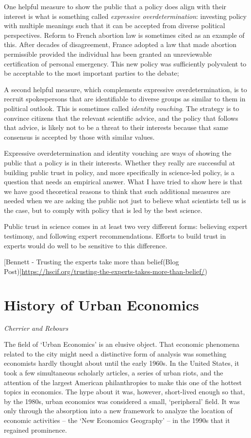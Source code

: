 \documentclass[
]{book}
\begin{document}
One helpful measure to show the public that a policy does align with their interest is what is something called \emph{expressive overdetermination}: investing policy with multiple meanings such that it can be accepted from diverse political perspectives. Reform to French abortion law is sometimes cited as an example of this. After decades of disagreement, France adopted a law that made abortion permissible provided the individual has been granted an unreviewable certification of personal emergency. This new policy was sufficiently polyvalent to be acceptable to the most important parties to the debate;

A second helpful measure, which complements expressive overdetermination, is to recruit spokespersons that are identifiable to diverse groups as similar to them in political outlook. This is sometimes called \emph{identity vouching}. The strategy is to convince citizens that the relevant scientific advice, and the policy that follows that advice, is likely not to be a threat to their interests because that same consensus is accepted by those with similar values.

Expressive overdetermination and identity vouching are ways of showing the public that a policy is in their interests. Whether they really are successful at building public trust in policy, and more specifically in science-led policy, is a question that needs an empirical answer. What I have tried to show here is that we have good theoretical reasons to think that such additional measures are needed when we are asking the public not just to believe what scientists tell us is the case, but to comply with policy that is led by the best science.

Public trust in science comes in at least two very different forms: believing expert testimony, and following expert recommendations. Efforts to build trust in experts would do well to be sensitive to this difference.

{[}Bennett - Trusting the experts take more than belief(Blog Post){]}\url{https://hscif.org/trusting-the-experts-takes-more-than-belief/})

\hypertarget{history-of-urban-economics}{%
\section{History of Urban Economics}\label{history-of-urban-economics}}

\emph{Cherrier and Rebours}

The field of `Urban Economics' is an elusive object. That economic phenomena related to the city might need a distinctive form of analysis was something economists hardly thought about until the early 1960s. In the United States, it took a few simultaneous scholarly articles, a series of urban riots, and the attention of the largest American philanthropies to make this one of the hottest topics in economics. The hype about it was, however, short-lived enough so­­­ that, by the 1980s, urban economics was considered a small, `peripheral' field. It was only through the absorption into a new framework to analyze the location of economic activities -- the `New Economics Geography' -- in the 1990s that it regained prominence.
\end{document}
